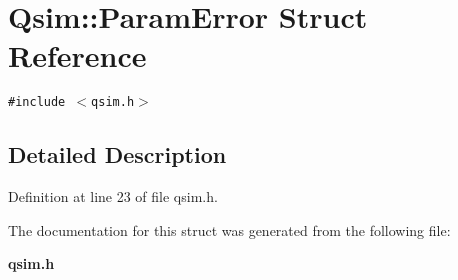 \section{Qsim::ParamError Struct Reference}
\label{structQsim_1_1ParamError}
{\tt \#include $<$qsim.h$>$}



\subsection{Detailed Description}


Definition at line 23 of file qsim.h.

The documentation for this struct was generated from the following file:\begin{CompactItemize}
\item 
{\bf qsim.h}\end{CompactItemize}
